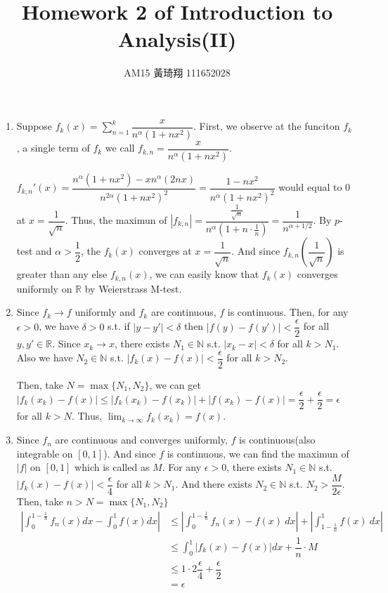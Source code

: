 \documentclass[12pt]{article}
\title{Homework 2 of Introduction to Analysis(II)}
\author{AM15 黃琦翔 111652028}
\begin{document}
\maketitle
\begin{enumerate}
    \item Suppose $f_k(x) = \displaystyle\sum_{n=1}^{k} \dfrac{x}{n^\alpha (1+nx^2)}$.
    First, we observe at the funciton $f_k$, a single term of $f_k$ we call $f_{k, n} = \dfrac{x}{n^{\alpha}(1+nx^2)}$.

    $f_{k, n}'(x) = \dfrac{n^{\alpha}(1+nx^2) - xn^{\alpha}(2nx)}{n^{2\alpha}(1+nx^2)^2} = \dfrac{1-nx^2}{n^{\alpha}(1+nx^2)^2}$ would equal to $0$ at $x = \dfrac{1}{\sqrt{n}}$.
    Thus, the maximun of $|f_{k, n}| = \dfrac{\frac{1}{\sqrt{n}}}{n^{\alpha}(1 + n \cdot \frac{1}{n})} = \dfrac{1}{n^{\alpha + 1/2}}$.
    By $p$-test and $\alpha> \dfrac{1}{2}$, the $f_k(x)$ converges at $x = \dfrac{1}{\sqrt{n}}$.
    And since $f_{k, n}(\dfrac{1}{\sqrt{n}})$ is greater than any else $f_{k, n}(x)$, 
    we can easily know that $f_k(x)$ converges uniformly on $\mathbb{R}$ by Weierstrass M-test.

    \item Since $f_k \to f$ uniformly and $f_k$ are continuous, $f$ is continuous.
    Then, for any $\epsilon > 0$, we have $\delta > 0 $ s.t. if $|y - y'| < \delta$ then $|f(y) - f(y')| < \dfrac{\epsilon}{2}$ for all $y, y' \in \mathbb{R}$.
    Since $x_k \to x$, there exists $N_1 \in \mathbb{N}$ s.t. $|x_k - x| < \delta$ for all $k > N_1$.
    Also we have $N_2 \in \mathbb{N}$ s.t. $|f_k(x) - f(x)| < \dfrac{\epsilon}{2}$ for all $k > N_2$.

    Then, take $N  = \max\{ N_1, N_2\}$, we can get $|f_k(x_k) - f(x)| \leq |f_k(x_k) - f(x_k)| + |f(x_k) - f(x)| = \dfrac{\epsilon}{2} + \dfrac{\epsilon}{2} = \epsilon$ for all $k > N$.
    Thus, $\displaystyle\lim_{k\to\infty} f_k(x_k) = f(x)$.

    \item Since $f_n$ are continuous and converges uniformly, $f$ is continuous(also integrable on $[0, 1]$).
    And since $f$ is continuous, we can find the maximun of $|f|$ on $[0, 1]$ which is called as $M$.
    For any $\epsilon > 0$, there exists $N_1 \in \mathbb{N}$ s.t. $|f_k(x) - f(x)| < \dfrac{\epsilon}{4}$ for all $k > N_1$.
    And there exists $N_2 \in \mathbb{N}$ s.t. $N_2 > \dfrac{M}{2\epsilon}$.
    Then, take $n > N = \max\{N_1, N_2\}$ \begin{align*}
        \left|\int_0^{1-\frac{1}{n}} f_n(x) dx - \int_0^1 f(x) dx\right| &\leq \left|\int_{0}^{1-\frac{1}{n}} f_n(x) - f(x)\ dx\right| + \left|\int_{1-\frac{1}{n}}^{1} f(x)\ dx\right|\\
        &\leq \int_0^1 |f_k(x) - f(x)| dx + \dfrac{1}{n} \cdot M\\
        &\leq 1 \cdot 2\dfrac{\epsilon}{4} + \dfrac{\epsilon}{2}\\
        &= \epsilon
    \end{align*}


\end{enumerate}
\end{document}
